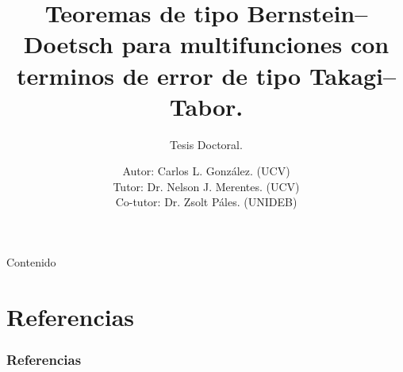 \documentclass{bredelebeamer}
\title[Teoremas de tipo Bernstein--Doetsch]{
  Teoremas de tipo Bernstein--Doetsch para multifunciones 
  con terminos de error de tipo Takagi--Tabor.
}
\subtitle{Tesis Doctoral.}
\author [Carlos L. González.]{ 
  Autor: Carlos L. González. (UCV)\\
  Tutor: Dr. Nelson J. Merentes. (UCV) \\
  Co-tutor: Dr. Zsolt Páles. (UNIDEB)
}
\begin{document}
\begin{frame}
  \titlepage
\end{frame}

\begin{frame}{Contenido}
  \tableofcontents
\end{frame}




\section{Referencias}
\begin{frame}[allowframebreaks]
  \frametitle{Referencias}
  \scriptsize{}%
  
  \beamertemplatearticlebibitems
\end{frame}
\end{document}

